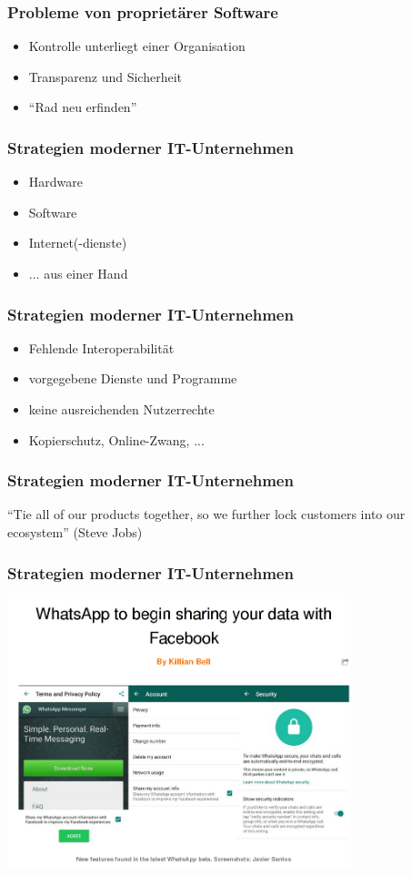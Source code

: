 \documentclass[12pt]{beamer}
\begin{document}
\begin{frame}
  \frametitle{Probleme von proprietärer Software}
  \begin{itemize}
    \item<2-> Kontrolle unterliegt einer Organisation
    \item<3-> Transparenz und Sicherheit
    \item<4-> ``Rad neu erfinden''
  \end{itemize}
\end{frame}

\begin{frame}
  \frametitle{Strategien moderner IT-Unternehmen}
  \begin{itemize}
    \item<2-> Hardware
    \item<3-> Software
    \item<4-> Internet(-dienste)
    \item<5-> ... aus einer Hand
  \end{itemize}
\end{frame}

\begin{frame}
  \frametitle{Strategien moderner IT-Unternehmen}
  \begin{itemize}
    \item<2-> Fehlende Interoperabilität
    \item<3-> vorgegebene Dienste und Programme
    \item<4-> keine ausreichenden Nutzerrechte
    \item<5-> Kopierschutz, Online-Zwang, ...
  \end{itemize}
\end{frame}

\begin{frame}
  \frametitle{Strategien moderner IT-Unternehmen}
  \begin{center}
    ``Tie all of our products together, so we further lock customers into our ecosystem'' (Steve Jobs)
  \end{center}
\end{frame}

\begin{frame}
  \frametitle{Strategien moderner IT-Unternehmen}
  \begin{center}
    \includegraphics[width=10cm]{img/facebook_whatsapp.png}
  \par\end{center}
\end{frame}
\end{document}

